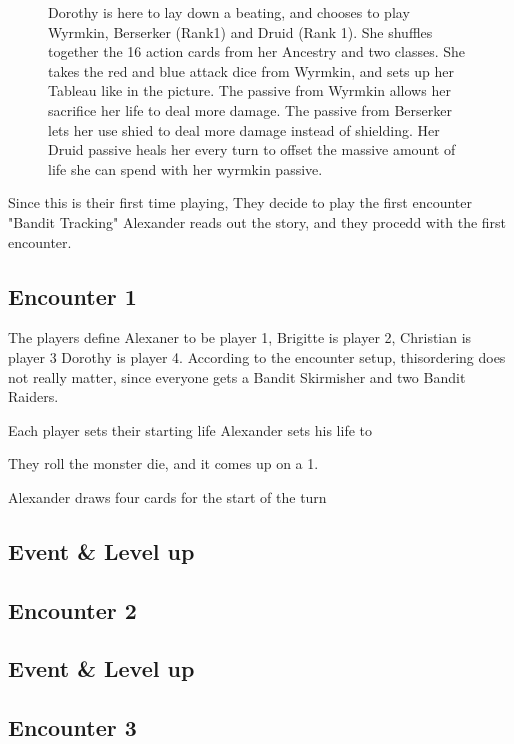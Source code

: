 	\begin{figure}[ht]
		\begin{minipage}[t][9cm][t]{0.5\textwidth}
			Dorothy is here to lay down a beating,  and chooses to play Wyrmkin, Berserker (Rank1) and Druid (Rank 1). She shuffles together the 16 action cards from her Ancestry and two classes. She takes the red and blue attack dice from Wyrmkin, and sets up her Tableau like in the picture. The passive from Wyrmkin allows her sacrifice her life to deal more damage. The passive from Berserker lets her use shied to deal more damage instead of shielding. Her Druid passive heals her every turn to  offset the massive amount of life she can spend with her wyrmkin passive.
			
		\end{minipage}	
		\begin{minipage}[t][9cm][t]{0.5\textwidth}
		\end{minipage}
	\end{figure}


Since this is their first time playing, They decide to play the first encounter "Bandit Tracking"
Alexander reads out the story, and they procedd with the first encounter. 

\subsection{Encounter 1}

The players define Alexaner to be player 1, Brigitte is player 2, Christian is player 3 Dorothy is player 4. According to the encounter setup, thisordering does not really matter, since everyone gets a Bandit Skirmisher and two Bandit Raiders. 

Each player sets their starting life
Alexander sets his life to 

They roll the monster die, and it comes up on a 1.

Alexander draws four cards for the start of the turn


\subsection{Event \& Level up}

\subsection{Encounter 2}

\subsection{Event \& Level up}

\subsection{Encounter 3}